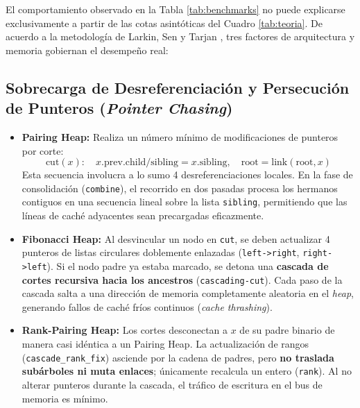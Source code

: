 \documentclass[11pt,a4paper]{article}
\begin{document}
El comportamiento observado en la Tabla \ref{tab:benchmarks} no puede explicarse exclusivamente a partir de las cotas asintóticas del Cuadro \ref{tab:teoria}. De acuerdo a la metodología de Larkin, Sen y Tarjan \cite{larkin2014back}, tres factores de arquitectura y memoria gobiernan el desempeño real:

\subsection{Sobrecarga de Desreferenciación y Persecución de Punteros (\textit{Pointer Chasing})}
\begin{itemize}
    \item \textbf{Pairing Heap:} Realiza un número mínimo de modificaciones de punteros por corte:
    $$\text{cut}(x): \quad x.\text{prev}.\text{child/sibling} = x.\text{sibling}, \quad \text{root} = \text{link}(\text{root}, x)$$
    Esta secuencia involucra a lo sumo 4 desreferenciaciones locales. En la fase de consolidación (\texttt{combine}), el recorrido en dos pasadas procesa los hermanos contiguos en una secuencia lineal sobre la lista \texttt{sibling}, permitiendo que las líneas de caché adyacentes sean precargadas eficazmente.
    
    \item \textbf{Fibonacci Heap:} Al desvincular un nodo en \texttt{cut}, se deben actualizar 4 punteros de listas circulares doblemente enlazadas (\texttt{left->right}, \texttt{right->left}). Si el nodo padre ya estaba marcado, se detona una \textbf{cascada de cortes recursiva hacia los ancestros} (\texttt{cascading-cut}). Cada paso de la cascada salta a una dirección de memoria completamente aleatoria en el \textit{heap}, generando fallos de caché fríos continuos (\textit{cache thrashing}).
    
    \item \textbf{Rank-Pairing Heap:} Los cortes desconectan a $x$ de su padre binario de manera casi idéntica a un Pairing Heap. La actualización de rangos (\texttt{cascade\_rank\_fix}) asciende por la cadena de padres, pero \textbf{no traslada subárboles ni muta enlaces}; únicamente recalcula un entero (\texttt{rank}). Al no alterar punteros durante la cascada, el tráfico de escritura en el bus de memoria es mínimo.
\end{itemize}
\end{document}
